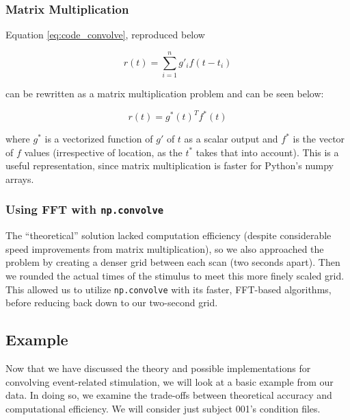 \subsubsection{Matrix Multiplication}
Equation \ref{eq:code_convolve}, reproduced below

$$r(t)= \sum_{i=1}^n g'_{i} f(t-t_i)$$

can be rewritten as a matrix multiplication problem and can be seen below:

\begin{equation} \label{eq:matrix_code_convolve}
r(t)=  g^*(t)^T f^*(t)
\end{equation}

where $g^*$ is a vectorized function of $g'$ of $t$ as a scalar output and 
$f^*$ is the vector of $f$ values (irrespective of location, as the $t^*$ 
takes that into account). This is a useful representation, since matrix 
multiplication is faster for Python's numpy arrays. 


\subsubsection{Using FFT with \texttt{np.convolve}}
The ``theoretical'' solution lacked computation efficiency (despite 
considerable speed improvements from matrix multiplication), so we also 
approached the problem by creating a denser grid between each scan (two seconds 
apart). Then we rounded the actual times of the stimulus to meet this more 
finely scaled grid. This allowed us to utilize \texttt{np.convolve} with its 
faster, FFT-based algorithms, before reducing back down to our two-second 
grid. 


\subsection{Example}

Now that we have discussed the theory and possible implementations 
for convolving event-related stimulation, we will look at a basic example from 
our data. In doing so, we examine the trade-offs between theoretical accuracy 
and computational efficiency. We will consider just subject 001's condition 
files. 


